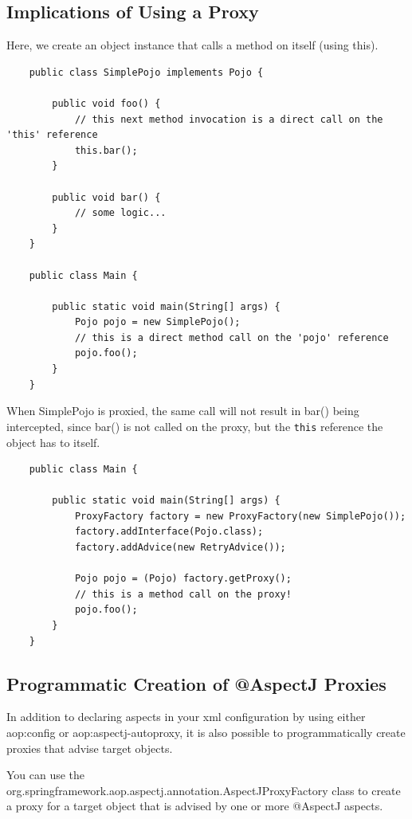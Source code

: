 \documentclass{scrartcl}
\begin{document}
\subsection{Implications of Using a Proxy}

Here, we create an object instance that calls a method on itself (using this).

\begin{lstlisting}
    public class SimplePojo implements Pojo {

        public void foo() {
            // this next method invocation is a direct call on the 'this' reference
            this.bar();
        }

        public void bar() {
            // some logic...
        }
    }

    public class Main {

        public static void main(String[] args) {
            Pojo pojo = new SimplePojo();
            // this is a direct method call on the 'pojo' reference
            pojo.foo();
        }
    }
\end{lstlisting}

When SimplePojo is proxied, the same call will not result in bar() being intercepted, since bar() is not called on the proxy, but the \lstinline[]|this| reference the object has to itself.

\begin{lstlisting}
    public class Main {

        public static void main(String[] args) {
            ProxyFactory factory = new ProxyFactory(new SimplePojo());
            factory.addInterface(Pojo.class);
            factory.addAdvice(new RetryAdvice());

            Pojo pojo = (Pojo) factory.getProxy();
            // this is a method call on the proxy!
            pojo.foo();
        }
    }
\end{lstlisting}

\subsection{Programmatic Creation of @AspectJ Proxies}

In addition to declaring aspects in your xml configuration by using either aop:config or aop:aspectj-autoproxy, it is also possible to programmatically create proxies that advise target objects.

You can use the org.springframework.aop.aspectj.annotation.AspectJProxyFactory class to create a proxy for a target object that is advised by one or more @AspectJ aspects.
\end{document}
